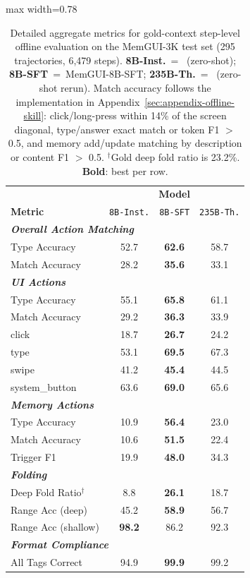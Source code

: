 \begin{table}[h]
\centering
\footnotesize
\renewcommand{\arraystretch}{1.04}
\setlength{\tabcolsep}{3.2pt}
\begin{adjustbox}{max width=0.78\linewidth}
\begin{tabular}{l ccc}
\toprule
& \multicolumn{3}{c}{\textbf{Model}} \\
\textbf{Metric} & \texttt{8B-Inst.} & \texttt{8B-SFT} & \texttt{235B-Th.} \\
\midrule
\multicolumn{4}{l}{\textit{\textbf{Overall Action Matching}}} \\
\quad Type Accuracy & 52.7 & \textbf{62.6} & 58.7 \\
\quad Match Accuracy & 28.2 & \textbf{35.6} & 33.1 \\
\midrule
\multicolumn{4}{l}{\textit{\textbf{UI Actions}}} \\
\quad Type Accuracy & 55.1 & \textbf{65.8} & 61.1 \\
\quad Match Accuracy & 29.2 & \textbf{36.3} & 33.9 \\
\quad\quad click & 18.7 & \textbf{26.7} & 24.2 \\
\quad\quad type & 53.1 & \textbf{69.5} & 67.3 \\
\quad\quad swipe & 41.2 & \textbf{45.4} & 44.5 \\
\quad\quad system\_button & 63.6 & \textbf{69.0} & 65.6 \\
\midrule
\multicolumn{4}{l}{\textit{\textbf{Memory Actions}}} \\
\quad Type Accuracy & 10.9 & \textbf{56.4} & 23.0 \\
\quad Match Accuracy & 10.6 & \textbf{51.5} & 22.4 \\
\quad Trigger F1 & 19.9 & \textbf{48.0} & 34.3 \\
\midrule
\multicolumn{4}{l}{\textit{\textbf{Folding}}} \\
\quad Deep Fold Ratio$^\dagger$ & 8.8 & \textbf{26.1} & 18.7 \\
\quad Range Acc (deep) & 45.2 & \textbf{58.9} & 56.7 \\
\quad Range Acc (shallow) & \textbf{98.2} & 86.2 & 92.3 \\
\midrule
\multicolumn{4}{l}{\textit{\textbf{Format Compliance}}} \\
\quad All Tags Correct & 94.9 & \textbf{99.9} & 99.2 \\
\bottomrule
\end{tabular}
\end{adjustbox}
\caption{Detailed aggregate metrics for gold-context step-level offline evaluation on the MemGUI-3K test set (295 trajectories, 6{,}479 steps). \textbf{8B-Inst.}~=~ (zero-shot); \textbf{8B-SFT}~=~MemGUI-8B-SFT; \textbf{235B-Th.}~=~ (zero-shot rerun). Match accuracy follows the implementation in Appendix~\ref{sec:appendix-offline-skill}: click/long-press within 14\% of the screen diagonal, type/answer exact match or token F1 $>$ 0.5, and memory add/update matching by description or content F1 $>$ 0.5. $^\dagger$Gold deep fold ratio is 23.2\%. \textbf{Bold}: best per row.}
\label{tab:offline-eval-detailed}
\end{table}
